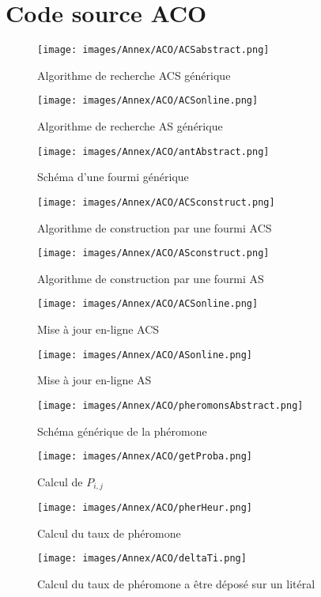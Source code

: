 \chapter{Code source ACO}

\begin{figure}[H]
	\centering
	\texttt{[image: images/Annex/ACO/ACSabstract.png]}
	\caption{Algorithme de recherche ACS générique}
\end{figure}

\begin{figure}[H]
	\centering
	\texttt{[image: images/Annex/ACO/ACSonline.png]}
	\caption{Algorithme de recherche AS générique}
\end{figure}

\begin{figure}[H]
	\centering
	\texttt{[image: images/Annex/ACO/antAbstract.png]}
	\caption{Schéma d'une fourmi générique}
\end{figure}

\begin{figure}[H]
	\centering
	\texttt{[image: images/Annex/ACO/ACSconstruct.png]}
	\caption{Algorithme de construction par une fourmi ACS}
\end{figure}

\begin{figure}[H]
	\centering
	\texttt{[image: images/Annex/ACO/ASconstruct.png]}
	\caption{Algorithme de construction par une fourmi AS}
\end{figure}

\begin{figure}[H]
	\centering
	\texttt{[image: images/Annex/ACO/ACSonline.png]}
	\caption{Mise à jour en-ligne ACS}
\end{figure}

\begin{figure}[H]
	\centering
	\texttt{[image: images/Annex/ACO/ASonline.png]}
	\caption{Mise à jour en-ligne AS}
\end{figure}

\begin{figure}[H]
	\centering
	\texttt{[image: images/Annex/ACO/pheromonsAbstract.png]}
	\caption{Schéma générique de la phéromone}
\end{figure}

\begin{figure}[H]
	\centering
	\texttt{[image: images/Annex/ACO/getProba.png]}
	\caption{Calcul de $P_{i,j}$}
\end{figure}

\begin{figure}[H]
	\centering
	\texttt{[image: images/Annex/ACO/pherHeur.png]}
	\caption{Calcul du taux de phéromone}
\end{figure}

\begin{figure}[H]
	\centering
	\texttt{[image: images/Annex/ACO/deltaTi.png]}
	\caption{Calcul du taux de phéromone a être déposé sur un litéral}
\end{figure}